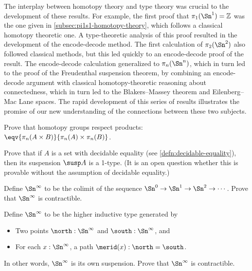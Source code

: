The interplay between homotopy theory and type theory was crucial to the
development of these results.  For example, the first proof that
$\pi_1(\Sn ^1)=\mathbb{Z}$ was the one given in \cref{subsec:pi1s1-homotopy-theory}, which follows a classical homotopy theoretic one.  A
type-theoretic analysis of this proof resulted in the development of the
encode-decode method.  The first calculation of $\pi_2(\Sn ^2)$ also followed
classical methods, but this led quickly to an encode-decode proof of the
result.  The encode-decode calculation generalized to $\pi_n(\Sn ^n)$, which
in turn led to the proof of the Freudenthal suspension theorem, by
combining an encode-decode argument with classical homotopy-theoretic
reasoning about connectedness, which in turn led to the Blakers--Massey
theorem and Eilenberg--Mac Lane spaces.  The rapid development of this
series of results illustrates the promise of our new understanding of
the connections between these two subjects.

\sectionExercises

\begin{ex}\label{ex:homotopy-groups-resp-prod}
  Prove that homotopy groups respect products: $\eqv{\pi_n(A\times B)}{\pi_n(A)\times \pi_n(B)}$.
\end{ex}

\begin{ex}\label{ex:decidable-equality-susp}
  Prove that if $A$ is a set with decidable equality (see \cref{defn:decidable-equality}), then its suspension $\susp A$ is a 1-type.
  (It is an open question whether this is provable without the assumption of decidable equality.)
\end{ex}

\begin{ex}\label{ex:contr-infinity-sphere-colim}
  Define $\Sn^\infty$ to be the colimit of the sequence $\Sn^0 \to \Sn^1 \to \Sn^2 \to\cdots$.
  Prove that $\Sn^\infty$ is contractible.
\end{ex}

\begin{ex}\label{ex:contr-infinity-sphere-susp}
  Define $\Sn^\infty$ to be the higher inductive type generated by
  \begin{itemize}
  \item Two points $\north:\Sn^\infty$ and $\south:\Sn^\infty$, and
  \item For each $x:\Sn^\infty$, a path $\merid(x):\north=\south$.
  \end{itemize}
  In other words, $\Sn^\infty$ is its own suspension.
  Prove that $\Sn^\infty$ is contractible.
\end{ex}

